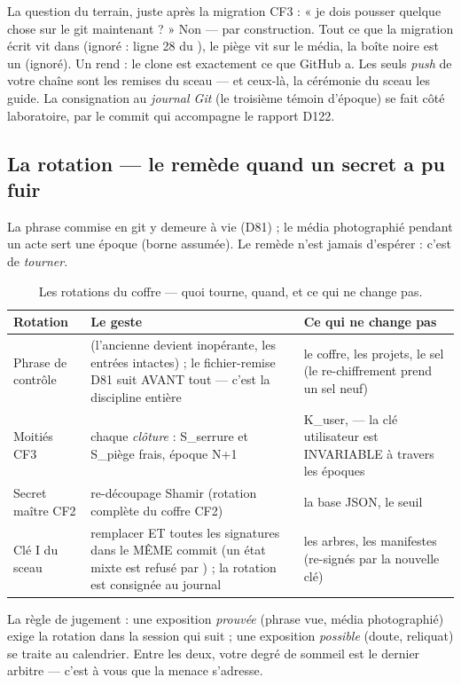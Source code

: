 \begin{terrain}
La question du terrain, juste après la migration CF3 : « je dois pousser quelque chose
sur le git maintenant ? » Non — par construction. Tout ce que la migration écrit vit
dans  (ignoré : ligne 28 du ), le piège vit
sur le média, la boîte noire est un  (ignoré). Un  rend
 : le clone est exactement ce que GitHub a. Les seuls
\emph{push} de votre chaîne sont les remises du sceau — et ceux-là, la cérémonie du
sceau les guide. La consignation au \emph{journal Git} (le troisième témoin d'époque)
se fait côté laboratoire, par le commit qui accompagne le rapport D122.
\end{terrain}

\subsection{La rotation — le remède quand un secret a pu fuir}\label{sec:rotation}

La phrase commise en git y demeure à vie (D81) ; le média photographié pendant un acte
sert une époque (borne assumée). Le remède n'est jamais d'espérer : c'est de
\emph{tourner}.

\begin{table}[htbp]
\centering\small
\caption{Les rotations du coffre — quoi tourne, quand, et ce qui ne change pas.}
\label{tab:rotations}
\begin{tabularx}{\textwidth}{@{}l Y Y@{}}
\toprule
\textbf{Rotation} & \textbf{Le geste} & \textbf{Ce qui ne change pas} \\
\midrule
Phrase de contrôle &  (l'ancienne devient inopérante, les
entrées intactes) ; le fichier-remise D81 suit AVANT tout — c'est la discipline
entière & le coffre, les projets, le sel (le re-chiffrement prend un sel neuf) \\
Moitiés CF3 & chaque \emph{clôture} : S\_serrure et S\_piège frais, époque N+1 &
K\_user,  — la clé utilisateur est INVARIABLE à travers les
époques \\
Secret maître CF2 & re-découpage Shamir (rotation complète du coffre CF2) & la base
JSON, le seuil \\
Clé I du sceau & remplacer  ET toutes les signatures dans le
MÊME commit (un état mixte est refusé par ) ; la rotation est consignée
au journal & les arbres, les manifestes (re-signés par la nouvelle clé) \\
\bottomrule
\end{tabularx}
\end{table}

La règle de jugement : une exposition \emph{prouvée} (phrase vue, média photographié)
exige la rotation dans la session qui suit ; une exposition \emph{possible} (doute,
reliquat) se traite au calendrier. Entre les deux, votre degré de sommeil est le
dernier arbitre — c'est à vous que la menace s'adresse.
